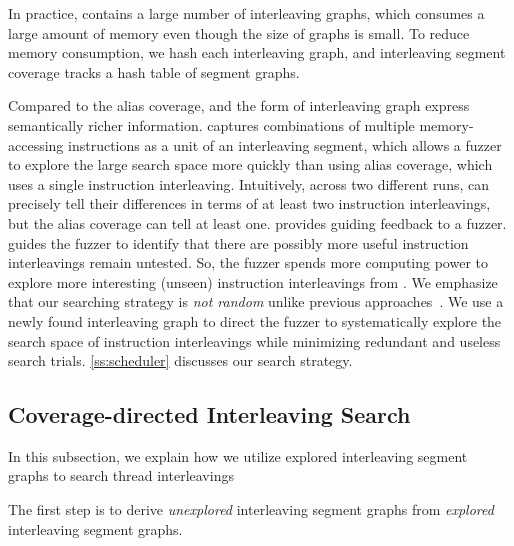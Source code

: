In practice, \intcov contains a large number of interleaving graphs, 
which consumes a large amount of memory even though the size of graphs is 
small.
%
To reduce memory consumption, we hash each interleaving graph,
and interleaving segment coverage tracks a hash table of segment
graphs.
%





%
%
Compared to the alias coverage, \intcov and the form of interleaving graph
express semantically richer information. \Intcov captures combinations 
of multiple memory-accessing instructions as a unit of an interleaving segment, which allows a fuzzer to explore the large search space more quickly than using alias coverage, which uses a single instruction interleaving. Intuitively, across two different runs, \intcov can precisely tell 
their differences in terms of at least two instruction interleavings, 
but the alias coverage can tell at least one.
\Intcov provides guiding feedback to a fuzzer.
\Intcov guides the fuzzer to identify that there are possibly more useful instruction interleavings remain untested. So, the fuzzer spends
more computing power to explore more interesting (unseen) instruction interleavings from \intcov. We emphasize that our searching strategy is 
\textit{not random} unlike previous approaches~\cite{krace, ski, pctalgorithm, muzz}.
%
We use a newly found interleaving graph to
direct the fuzzer to systematically explore the search space of
instruction interleavings while minimizing redundant and useless
search trials. \autoref{ss:scheduler} discusses our search strategy.


\subsection{Coverage-directed Interleaving Search}
\label{ss:scheduler}
%
In this subsection, we explain how we utilize explored interleaving
segment graphs to search thread interleavings 

%
The first step is to derive \textit{unexplored} interleaving segment
graphs from \textit{explored} interleaving segment graphs.

